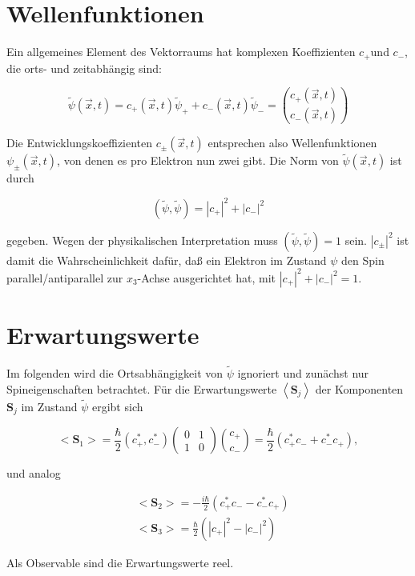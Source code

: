 \documentclass[10pt, letterpaper]{article}
\begin{document}
\section*{Wellenfunktionen}
Ein allgemeines Element des Vektorraums hat komplexen Koeffizienten $c_{+}$und $c_{-}$, die orts- und zeitabhängig sind:

$$
\tilde{\psi}(\vec{x}, t)=c_{+}(\vec{x}, t) \tilde{\psi}_{+}+c_{-}(\vec{x}, t) \tilde{\psi}_{-}=\binom{c_{+}(\vec{x}, t)}{c_{-}(\vec{x}, t)}
$$

Die Entwicklungskoeffizienten $c_{ \pm}(\vec{x}, t)$ entsprechen also Wellenfunktionen $\psi_{ \pm}(\vec{x}, t)$, von denen es pro Elektron nun zwei gibt. Die Norm von $\tilde{\psi}(\vec{x}, t)$ ist durch

$$
(\tilde{\psi}, \tilde{\psi})=\left|c_{+}\right|^{2}+\left|c_{-}\right|^{2}
$$

gegeben. Wegen der physikalischen Interpretation muss $(\tilde{\psi}, \tilde{\psi})=1$ sein. $\left|c_{ \pm}\right|^{2}$ ist damit die Wahrscheinlichkeit dafür, daß ein Elektron im Zustand $\psi$ den Spin parallel/antiparallel zur $x_{3}$-Achse ausgerichtet hat, mit $\left|c_{+}\right|^{2}+\left|c_{-}\right|^{2}=1$.

\section*{Erwartungswerte}
Im folgenden wird die Ortsabhängigkeit von $\tilde{\psi}$ ignoriert und zunächst nur Spineigenschaften betrachtet. Für die Erwartungswerte $\left\langle\mathbf{S}_{j}\right\rangle$ der Komponenten $\mathbf{S}_{j}$ im Zustand $\tilde{\psi}$ ergibt sich

$$
<\mathbf{S}_{1}>=\frac{\hbar}{2}\left(c_{+}^{*}, c_{-}^{*}\right)\left(\begin{array}{ll}
0 & 1 \\
1 & 0
\end{array}\right)\binom{c_{+}}{c_{-}}=\frac{\hbar}{2}\left(c_{+}^{*} c_{-}+c_{-}^{*} c_{+}\right),
$$

und analog

$$
\begin{aligned}
& <\mathbf{S}_{2}>=-\frac{i \hbar}{2}\left(c_{+}^{*} c_{-}-c_{-}^{*} c_{+}\right) \\
& <\mathbf{S}_{3}>=\frac{\hbar}{2}\left(\left|c_{+}\right|^{2}-\left|c_{-}\right|^{2}\right)
\end{aligned}
$$

Als Observable sind die Erwartungswerte reel.
\end{document}
